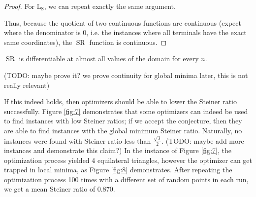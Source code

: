 \documentclass{mpaper}
\begin{document}
\begin{proof}
  For $\operatorname{L_S}$, we can repeat exactly the same argument.


  Thus, because the quotient of two continuous functions are continuous (expect where the denominator is 0, i.e. the instances where all terminals have the exact same coordinates), the $\operatorname{SR}$ function is continuous.

\end{proof}

\begin{conjecture}
  $\operatorname{SR}$ is differentiable at almost all values of the domain for every $n$.
\end{conjecture}

(TODO: maybe prove it? we prove continuity for global minima later, this is not really relevant) 

If this indeed holds, then optimizers should be able to lower the Steiner ratio successfully. Figure \ref{fig:7} demonstrates that some optimizers can indeed be used to find instances with low Steiner ratios; if we accept the conjecture, then they are able to find instances with the global minimum Steiner ratio. Naturally, no instances were found with Steiner ratio less than $\frac{\sqrt{3}}{2}$. (TODO: maybe add more instances and demonstrate this claim?) In the instance of Figure \ref{fig:7}, the optimization process yielded 4 equilateral triangles, however the optimizer can get trapped in local minima, as Figure \ref{fig:8} demonstrates. After repeating the optimization process 100 times with a different set of random points in each run, we get a mean Steiner ratio of 0.870.
\end{document}
